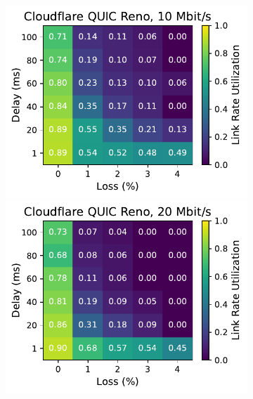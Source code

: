\begin{figure}[ht]
\begin{subfigure}[b]{0.22\linewidth}
        \includegraphics[width=\linewidth,trim={0 0 2cm 0},clip]{splitting-paper/figures/heatmaps/heatmap_quiche_reno_10mbps.pdf}
        \includegraphics[width=\linewidth,trim={0 0 2cm 0},clip]{splitting-paper/figures/heatmaps/heatmap_quiche_reno_20mbps.pdf}

\end{subfigure}
\end{figure}
